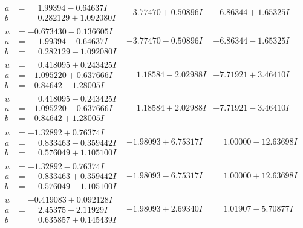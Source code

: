 \documentclass[1p]{elsarticle_modified}
\theoremstyle{definition}
\begin{document}
$$\begin{array}{c|c|c}
\begin{aligned}
a &= \phantom{-}1.99394 - 0.64637 I \\
b &= \phantom{-}0.282129 + 1.092080 I\end{aligned}
 & -3.77470 + 0.50896 I & -6.86344 + 1.65325 I \\ \hline\begin{aligned}
u &= -0.673430 - 0.136605 I \\
a &= \phantom{-}1.99394 + 0.64637 I \\
b &= \phantom{-}0.282129 - 1.092080 I\end{aligned}
 & -3.77470 - 0.50896 I & -6.86344 - 1.65325 I \\ \hline\begin{aligned}
u &= \phantom{-}0.418095 + 0.243425 I \\
a &= -1.095220 + 0.637666 I \\
b &= -0.84642 - 1.28005 I\end{aligned}
 & \phantom{-}1.18584 - 2.02988 I & -7.71921 + 3.46410 I \\ \hline\begin{aligned}
u &= \phantom{-}0.418095 - 0.243425 I \\
a &= -1.095220 - 0.637666 I \\
b &= -0.84642 + 1.28005 I\end{aligned}
 & \phantom{-}1.18584 + 2.02988 I & -7.71921 - 3.46410 I \\ \hline\begin{aligned}
u &= -1.32892 + 0.76374 I \\
a &= \phantom{-}0.833463 - 0.359442 I \\
b &= \phantom{-}0.576049 + 1.105100 I\end{aligned}
 & -1.98093 + 6.75317 I & \phantom{-}1.00000 - 12.63698 I \\ \hline\begin{aligned}
u &= -1.32892 - 0.76374 I \\
a &= \phantom{-}0.833463 + 0.359442 I \\
b &= \phantom{-}0.576049 - 1.105100 I\end{aligned}
 & -1.98093 - 6.75317 I & \phantom{-}1.00000 + 12.63698 I \\ \hline\begin{aligned}
u &= -0.419083 + 0.092128 I \\
a &= \phantom{-}2.45375 - 2.11929 I \\
b &= \phantom{-}0.635857 + 0.145439 I\end{aligned}
 & -1.98093 + 2.69340 I & \phantom{-}1.01907 - 5.70877 I \\ \hline\begin{aligned}

\end{aligned}
\end{array}$$
\end{document}
